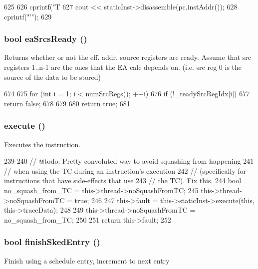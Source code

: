 \begin{DoxyCode}
625 {
626     cprintf("T%
627     cout << staticInst->disassemble(pc.instAddr());
628     cprintf("'\n");
629 }
\end{DoxyCode}
\hypertarget{classInOrderDynInst_ae3a07556a5b5d8248cbfb1c99561340d}{
\subsubsection[{eaSrcsReady}]{\setlength{\rightskip}{0pt plus 5cm}bool eaSrcsReady ()}}
\label{classInOrderDynInst_ae3a07556a5b5d8248cbfb1c99561340d}
Returns whether or not the eff. addr. source registers are ready. Assume that src registers 1..n-\/1 are the ones that the EA calc depends on. (i.e. src reg 0 is the source of the data to be stored) 


\begin{DoxyCode}
674     {
675         for (int i = 1; i < numSrcRegs(); ++i) {
676             if (!_readySrcRegIdx[i])
677                 return false;
678         }
679 
680         return true;
681     }
\end{DoxyCode}
\hypertarget{classInOrderDynInst_a1a8de76be7ad0985553c5bae9f26a55b}{
\subsubsection[{execute}]{ execute ()}}
\label{classInOrderDynInst_a1a8de76be7ad0985553c5bae9f26a55b}
Executes the instruction. 


\begin{DoxyCode}
239 {
240     // @todo: Pretty convoluted way to avoid squashing from happening
241     // when using the TC during an instruction's execution
242     // (specifically for instructions that have side-effects that use
243     // the TC).  Fix this.
244     bool no_squash_from_TC = this->thread->noSquashFromTC;
245     this->thread->noSquashFromTC = true;
246 
247     this->fault = this->staticInst->execute(this, this->traceData);
248 
249     this->thread->noSquashFromTC = no_squash_from_TC;
250 
251     return this->fault;
252 }
\end{DoxyCode}
\hypertarget{classInOrderDynInst_a3a3248cb4b3c8f99af61fdc4bc3ca8ab}{
\subsubsection[{finishSkedEntry}]{\setlength{\rightskip}{0pt plus 5cm}bool finishSkedEntry ()}}
\label{classInOrderDynInst_a3a3248cb4b3c8f99af61fdc4bc3ca8ab}
Finish using a schedule entry, increment to next entry 


